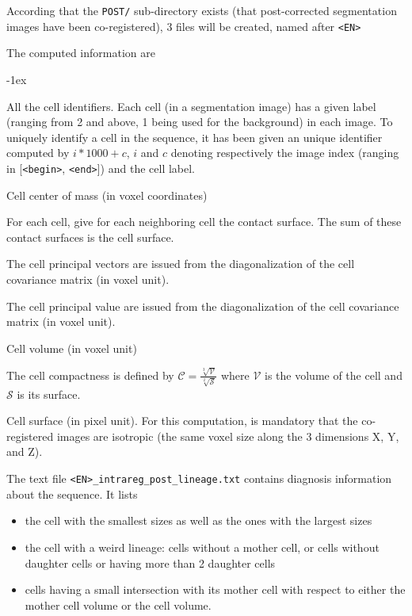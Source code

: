 According that the \texttt{POST/} sub-directory exists (that post-corrected segmentation images have been co-registered), 3 files will be created, named after \texttt{<EN>}

\mbox{}

The computed information are
\begin{description}
  \itemsep -1ex
\item[\texttt{all\_cells}] All the cell identifiers. Each cell (in a segmentation image) has a given label (ranging from 2 and above, 1 being used for the background) in each image. To uniquely identify a cell in the sequence, it has been given an unique identifier computed by $i * 1000 + c$, $i$ and $c$ denoting respectively the image index (ranging in [\texttt{<begin>}, \texttt{<end>}]) and the cell label.
\item[\texttt{cell\_barycenter}] Cell center of mass (in voxel coordinates)
\item[\texttt{cell\_contact\_surface}] For each cell, give for each neighboring cell the contact surface. The sum of these contact surfaces is the cell surface.
\item[\texttt{cell\_principal\_vectors}] The cell principal vectors are issued from the diagonalization of the cell covariance matrix (in voxel unit).
\item[\texttt{cell\_principal\_values}] The cell principal value are issued from the diagonalization of the cell covariance matrix (in voxel unit).
\item[\texttt{cell\_volume}] Cell volume (in voxel unit)
\item[\texttt{cell\_compactness}] The cell compactness is defined by $\mathcal{C} =\frac{\sqrt[3]{\mathcal{V}}}{\sqrt[2]{\mathcal{S}}}$ where $\mathcal{V}$ is the volume of the cell and $\mathcal{S}$ is its surface.
\item[\texttt{cell\_surface}] Cell surface (in pixel unit). For this computation, is mandatory that the co-registered images are isotropic (the same voxel size along the 3 dimensions X, Y, and Z).
\item[\texttt{cell\_lineage}]
\end{description}

The text file \texttt{<EN>\_intrareg\_post\_lineage.txt} contains diagnosis information about the sequence. It lists
\begin{itemize}
  \itemsep -1ex
\item the cell with the smallest sizes as well as the ones with the largest sizes
\item the cell with a weird lineage: cells without a mother cell, or cells without daughter cells or having more than 2 daughter cells
\item cells having a small intersection with its mother cell with respect to either the mother cell volume or the cell volume. 
\end{itemize}


